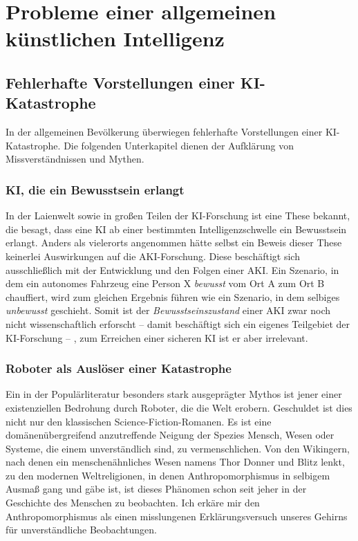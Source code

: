 \chapter{Probleme einer allgemeinen künstlichen Intelligenz}
\section{Fehlerhafte Vorstellungen einer KI-Katastrophe}
In der allgemeinen Bevölkerung überwiegen fehlerhafte Vorstellungen einer KI-Katastrophe. Die folgenden Unterkapitel dienen der Aufklärung von Missverständnissen und Mythen.
\subsection{KI, die ein Bewusstsein erlangt}
In der Laienwelt sowie in großen Teilen der KI-Forschung ist eine These bekannt, die besagt, dass eine KI ab einer bestimmten Intelligenzschwelle ein Bewusstsein erlangt. Anders als vielerorts angenommen hätte selbst ein Beweis dieser These keinerlei Auswirkungen auf die AKI-Forschung. Diese beschäftigt sich ausschließlich mit der Entwicklung und den Folgen einer AKI. Ein Szenario, in dem ein autonomes Fahrzeug eine Person X \emph{bewusst} vom Ort A zum Ort B chauffiert, wird zum gleichen Ergebnis führen wie ein Szenario, in dem selbiges \emph{unbewusst} geschieht. Somit ist der \emph{Bewusstseinszustand} einer AKI zwar noch nicht wissenschaftlich erforscht -- damit beschäftigt sich ein eigenes Teilgebiet der KI-Forschung -- , zum Erreichen einer sicheren KI ist er aber irrelevant. 
\subsection{Roboter als Auslöser einer Katastrophe}
Ein in der Populärliteratur besonders stark ausgeprägter Mythos ist jener einer existenziellen Bedrohung durch Roboter, die die Welt erobern. Geschuldet ist dies nicht nur den klassischen Science-Fiction-Romanen. Es ist eine domänenübergreifend anzutreffende Neigung der Spezies Mensch, Wesen oder Systeme, die einem unverständlich sind, zu vermenschlichen. Von den Wikingern, nach denen ein menschenähnliches Wesen namens Thor Donner und Blitz lenkt, zu den modernen Weltreligionen, in denen Anthropomorphismus in selbigem Ausmaß gang und gäbe ist, ist dieses Phänomen schon seit jeher in der Geschichte des Menschen zu beobachten. Ich erkäre mir den Anthropomorphismus als einen misslungenen Erklärungsversuch unseres Gehirns für unverständliche Beobachtungen.

